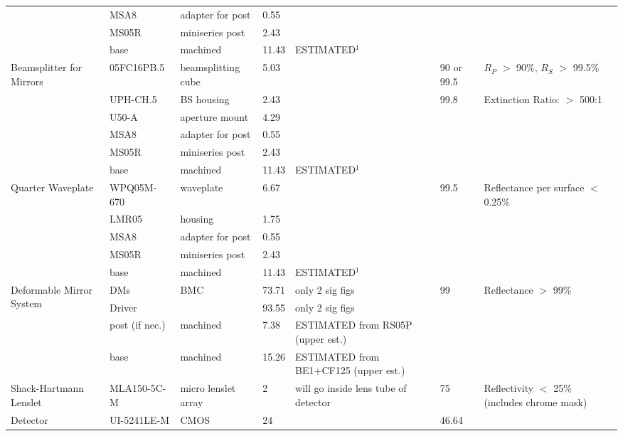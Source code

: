 \documentclass[12pt]{article}
\begin{document}
\begin{landscape}
\begin{center}
\begin{longtable}{| p{3.25cm} | p{2.2cm} | p{3cm} | p{1.75cm} | p{2.5cm} | p{1.55cm} | p{5cm} |}
          & MSA8  & adapter for post & 0.55  &       &       &  \\
          & MS05R & miniseries post & 2.43  &       &       &  \\
          & base  & machined & 11.43 & ESTIMATED$^1$ &       &  \\ \hline
    \multirow{6}{*}{\parbox{3.25cm}{Beamsplitter for Mirrors}} & 05FC16PB.5 & beamsplitting cube & 5.03  &       & 90 or 99.5 & $R_P$ $>$ 90\%, $R_S$ $>$ 99.5\% \\ 
          & UPH-CH.5 & BS housing & 2.43  &       & 99.8  & Extinction Ratio: $>$ 500:1 \\
          & U50-A & aperture mount & 4.29  &       &       &  \\
          & MSA8  & adapter for post & 0.55  &       &       &  \\
          & MS05R & miniseries post & 2.43  &       &       &  \\
          & base  & machined & 11.43 & ESTIMATED$^1$ &       &  \\ \hline
    \multirow{5}{*}{\parbox{3.25cm}{Quarter Waveplate}} & WPQ05M-670 & waveplate & 6.67  &       & 99.5  & Reflectance per surface $<$ 0.25\% \\ 
          & LMR05 & housing & 1.75  &       &       &  \\
          & MSA8  & adapter for post & 0.55  &       &       &  \\
          & MS05R & miniseries post & 2.43  &       &       &  \\
          & base  & machined & 11.43 & ESTIMATED$^1$ &       &  \\ \hline
    \multirow{4}{*}{\parbox{3.25cm}{Deformable Mirror System}} & DMs   & BMC   & 73.71 & only 2 sig figs & 99    & Reflectance $>$ 99\% \\ 
          & Driver &       & 93.55 & only 2 sig figs &       &  \\
          & post (if nec.) & machined & 7.38  & ESTIMATED from RS05P (upper est.) &       &  \\
          & base  & machined & 15.26 & ESTIMATED from BE1+CF125 (upper est.) &       &  \\ \hline
    Shack-Hartmann Lenslet & MLA150-5C-M & micro lenslet array & 2     & will go inside lens tube of detector & 75    & Reflectivity $<$ 25\% (includes chrome mask) \\ \hline
    \multirow{3}{*}{Detector} & UI-5241LE-M & CMOS  & 24    &       & 46.64 &  \\ 

\end{longtable}
\end{center}
\end{landscape}
\end{document}
